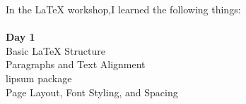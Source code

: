 \documentclass[12pt,a4paper]{article}
\begin{document}
\par\noindent In the LaTeX workshop,I learned the following things:\\\\
\Large{\textbf{Day 1}} \\
Basic LaTeX Structure \\
Paragraphs and Text Alignment \\
lipsum package \\
Page Layout, Font Styling, and Spacing
\end{document}
